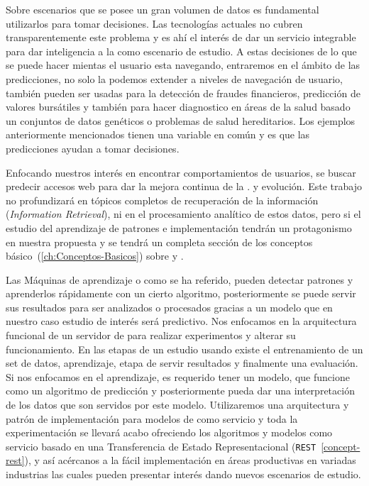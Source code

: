 Sobre escenarios que se posee un gran volumen de datos es fundamental utilizarlos para tomar decisiones. Las tecnologías actuales no cubren transparentemente este problema y es ahí el interés de dar un servicio integrable para dar inteligencia a la \www como escenario de estudio.
A estas decisiones de lo que se puede hacer mientas el usuario esta navegando, entraremos en el ámbito de las predicciones, no solo la podemos extender {a niveles de navegación de usuario, también pueden ser usadas para la detección de fraudes financieros, predicción de valores bursátiles y también para hacer diagnostico en áreas de la salud basado un conjuntos de datos genéticos o problemas de salud hereditarios. Los ejemplos anteriormente mencionados tienen una variable en común y es que las predicciones ayudan a tomar decisiones}.\label{ejemplos-casos-contextopreliminar
}



Enfocando nuestros interés en encontrar comportamientos de usuarios, se buscar predecir accesos web para dar la mejora continua de la \www. y evolución. Este trabajo no profundizará en tópicos completos de recuperación de la información (\emph{Information Retrieval}), ni en el procesamiento analítico de estos datos, pero si el estudio del aprendizaje de patrones e implementación tendrán un protagonismo en nuestra propuesta y se tendrá un completa sección de los conceptos básico~(\ref{ch:Conceptos-Basicos}) sobre \losslessdatacompression y \machinelearning.


Las Máquinas de aprendizaje o \machinelearning como se ha referido, pueden detectar patrones y aprenderlos rápidamente con un cierto algoritmo, posteriormente se puede servir sus resultados para ser analizados o procesados gracias a un modelo que en nuestro caso estudio de interés será predictivo. Nos enfocamos en la arquitectura funcional de un servidor de \machinelearning para realizar experimentos y alterar su funcionamiento. En las etapas de un estudio usando \machinelearning existe el entrenamiento de un set de datos, aprendizaje, etapa de servir resultados y finalmente una evaluación.  Si nos enfocamos en el aprendizaje, es requerido tener un modelo, que funcione como un algoritmo de predicción y posteriormente pueda dar una interpretación de los datos que son servidos por este modelo. Utilizaremos una arquitectura y patrón de implementación para modelos de \machinelearning como servicio y toda la experimentación se llevará acabo ofreciendo los algoritmos y modelos como servicio basado en una Transferencia de Estado Representacional (\texttt{REST}~\ref{concept-rest}), y así acércanos a la fácil implementación en áreas productivas en variadas industrias las cuales pueden presentar interés dando nuevos escenarios de estudio.

